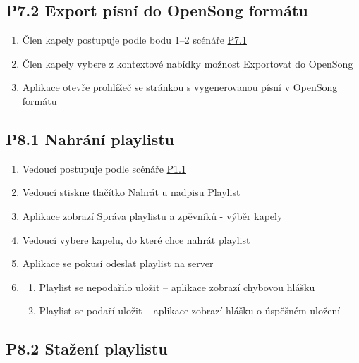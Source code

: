 \subsection{P7.2 Export písní do OpenSong formátu}
\label{P7.2}

\begin{enumerate}
    \item Člen kapely postupuje podle bodu 1--2 scénáře \hyperref[P7.1]{P7.1}
    \item Člen kapely vybere z kontextové nabídky možnost Exportovat do OpenSong
    \item Aplikace otevře prohlížeč se stránkou s vygenerovanou písní v OpenSong formátu
\end{enumerate}

\subsection{P8.1 Nahrání playlistu}
\label{P8.1}

\begin{enumerate}
    \item Vedoucí postupuje podle scénáře \hyperref[P1.1]{P1.1}
    \item Vedoucí stiskne tlačítko Nahrát u nadpisu Playlist
    \item Aplikace zobrazí Správa playlistu a zpěvníků - výběr kapely
    \item Vedoucí vybere kapelu, do které chce nahrát playlist
    \item Aplikace se pokusí odeslat playlist na server
    \item \begin{enumerate}
        \item Playlist se nepodařilo uložit -- aplikace zobrazí chybovou hlášku
        \item Playlist se podaří uložit -- aplikace zobrazí hlášku o úspěšném uložení
    \end{enumerate}
\end{enumerate}

\subsection{P8.2 Stažení playlistu}
\label{P8.2}

